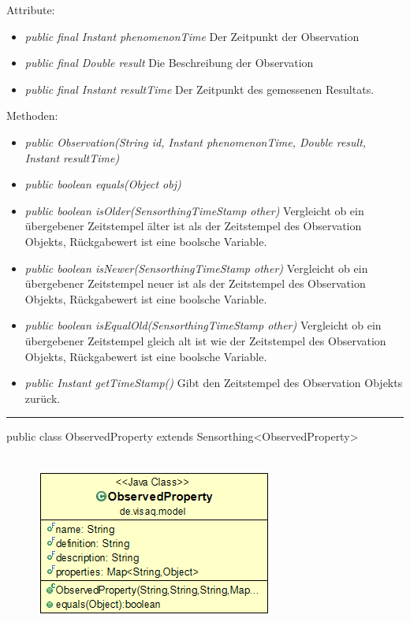 Attribute:
\begin{itemize}
	\item \emph{public final Instant phenomenonTime} Der Zeitpunkt der Observation
	\item \emph{public final Double result} Die Beschreibung der Observation
	\item \emph{public final Instant resultTime} Der Zeitpunkt des gemessenen Resultats.
\end{itemize}
Methoden:
\begin{itemize}
	\item \emph{public Observation(String id, Instant phenomenonTime, Double result, Instant resultTime)} 
	\item \emph{public boolean equals(Object obj)} 
	\item \emph{public boolean isOlder(SensorthingTimeStamp other)} Vergleicht ob ein übergebener Zeitstempel älter ist als der Zeitstempel des Observation Objekts, Rückgabewert ist eine boolsche Variable.
	\item \emph{public boolean isNewer(SensorthingTimeStamp other)} Vergleicht ob ein übergebener Zeitstempel neuer ist als der Zeitstempel des Observation Objekts, Rückgabewert ist eine boolsche Variable.
	\item \emph{public boolean isEqualOld(SensorthingTimeStamp other)} Vergleicht ob ein übergebener Zeitstempel gleich alt ist wie der Zeitstempel des Observation Objekts, Rückgabewert ist eine boolsche Variable.
	\item \emph{public Instant getTimeStamp()} Gibt den Zeitstempel des Observation Objekts zurück.
\end{itemize}

\rule{\textwidth}{0.4pt}
public class ObservedProperty extends Sensorthing<ObservedProperty>
\\\\
\begin{minipage}{0.3\textwidth}
	\begin{figure}[H]
		\includegraphics[scale = 0.5
		]{media/frontend/model/ObservedPropertyClass.png}
	\end{figure}
\end{minipage} \hfill
\begin{minipage}{0.6\textwidth}
\end{minipage}

